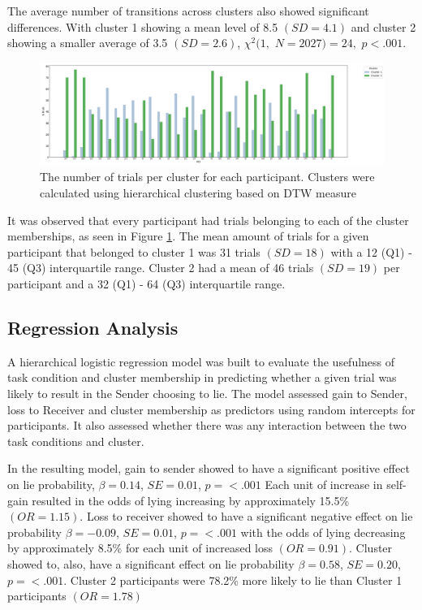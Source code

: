 \documentclass[man, floatsintext]{apa7}
\begin{document}
The average number of transitions across clusters also showed significant differences. With cluster 1 showing a mean level of 8.5 $(SD = 4.1)$ and cluster 2 showing a smaller average of 3.5 $(SD = 2.6)$, $\chi^2(1,$ $N=2027) = 24,$ $p<.001$.

\begin{figure}[H]
	\centering
	\includegraphics[width=\linewidth]{../plots/ALLTRIAL/NTrialsByPID.png}
	\caption{The number of trials per cluster for each participant. Clusters were calculated using hierarchical clustering based on DTW measure}
	\label{fig:NTrialsByPIDPerCluster}
\end{figure}


It was observed that every participant had trials belonging to each of the cluster memberships, as seen in Figure \ref{fig:NTrialsByPIDPerCluster}. The mean amount of trials for a given participant that belonged to cluster 1 was 31 trials $(SD = 18)$ with a 12 (Q1) - 45 (Q3) interquartile range. Cluster 2 had a mean of 46 trials $(SD = 19)$ per participant and a 32 (Q1) - 64 (Q3) interquartile range. 

\subsection{Regression Analysis}

A hierarchical logistic regression model was built to evaluate the usefulness of task condition and cluster membership in predicting whether a given trial was likely to result in the Sender choosing to lie. The model assessed gain to Sender, loss to Receiver and cluster membership as predictors using random intercepts for participants. It also assessed whether there was any interaction between the two task conditions and cluster.

In the resulting model, gain to sender showed to have a significant positive effect on lie probability, $\beta = 0.14$, $SE = 0.01$, $p = < .001$ Each unit of increase in self-gain resulted in the odds of lying increasing by approximately 15.5\% $(OR=1.15)$. Loss to receiver showed to have a significant negative effect on lie probability $\beta = -0.09$, $SE = 0.01$, $p = < .001$ with the odds of lying decreasing by approximately 8.5\% for each unit of increased loss $(OR=0.91)$. Cluster showed to, also, have a significant effect on lie probability $\beta = 0.58$, $SE = 0.20$, $p = < .001$. Cluster 2 participants were 78.2\% more likely to lie than Cluster 1 participants $(OR=1.78)$
\end{document}
